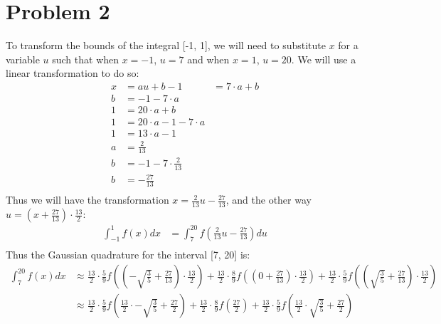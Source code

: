 \documentclass{article}
\begin{document}
\section*{Problem 2}
To transform the bounds of the integral [-1, 1], we will need to substitute $x$ for a variable $u$ such that when $x = -1$, $u = 7$ and when $x = 1$, $u = 20$. We will use a linear transformation to do so: \\
\begin{align*}
x &= au + b
-1 &= 7 \cdot a + b \\
b &= -1 - 7 \cdot a \\
1 &= 20 \cdot a + b \\
1 &= 20 \cdot a -1 - 7 \cdot a \\
1 &= 13 \cdot a - 1 \\
a &= \frac{2}{13} \\
b &= -1 - 7 \cdot \frac{2}{13} \\
b &= -\frac{27}{13}\\
\end{align*}
Thus we will have the transformation $x = \frac{2}{13}u - \frac{27}{13}$, and the other way $u  = (x + \frac{27}{13}) \cdot \frac{13}{2}$: \\
\begin{align*}
\int_{-1}^1f(x)dx &= \int_{7}^{20}f( \frac{2}{13}u - \frac{27}{13})du \\
\end{align*}
Thus the Gaussian quadrature for the interval [7, 20] is:\\
\begin{align*}
\int_{7}^{20}f(x)dx &\approx \frac{13}{2} \cdot \frac{5}{9}f((-\sqrt{\frac{3}{5}} + \frac{27}{13}) \cdot \frac{13}{2}) + \frac{13}{2} \cdot \frac{8}{9}f((0 + \frac{27}{13}) \cdot \frac{13}{2}) + \frac{13}{2} \cdot \frac{5}{9}f((\sqrt{\frac{3}{5}} + \frac{27}{13}) \cdot \frac{13}{2})\\
&\approx  \frac{13}{2} \cdot \frac{5}{9}f(\frac{13}{2} \cdot -\sqrt{\frac{3}{5}} + \frac{27}{2}) + \frac{13}{2} \cdot \frac{8}{9}f(\frac{27}{2}) +  \frac{13}{2} \cdot \frac{5}{9}f(\frac{13}{2} \cdot \sqrt{\frac{3}{5}} + \frac{27}{2})
\end{align*}
\end{document}

